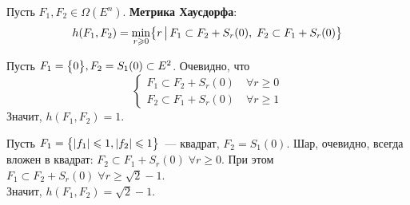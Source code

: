 \begin{defn}
    Пусть $F_1, F_2 \in \Omega(E^n)$.
    \textbf{Метрика Хаусдорфа}:
    \begin{equation}
        h(F_1, F_2) = \min\limits_{r \geqslant 0} \bigl\{ r \, \bigl| \, F_1 \subset F_2 + S_r(0), \; F_2 \subset F_1 + S_r(0) \bigr\}
    \end{equation}
\end{defn}

\begin{exmp}
    Пусть $F_1 = \bigl\{ 0 \bigr\}, F_2 = S_1(0) \subset E^2$.
    Очевидно, что
    \begin{equation*}
        \begin{cases}
            F_1 \subset F_2 + S_r(0) \quad \forall r \geqslant 0 \\
            F_2 \subset F_1 + S_r(0) \quad \forall r \geqslant 1
        \end{cases}
    \end{equation*}
    Значит, $h(F_1, F_2) = 1$.
\end{exmp}

\begin{exmp}
    Пусть $F_1 = \bigl\{ |f_1| \leqslant 1, |f_2| \leqslant 1 \bigr\}$~--- квадрат, $F_2 = S_1(0)$.
    Шар, очевидно, всегда вложен в квадрат: $F_2 \subset F_1 + S_r(0) \; \forall r \geqslant 0$.
    При этом $F_1 \subset F_2 + S_r(0) \; \forall r \geqslant \sqrt{2} - 1$. \\
    Значит, $h(F_1, F_2) = \sqrt{2} - 1$.

    \begin{center}
    \end{center}
\end{exmp}


